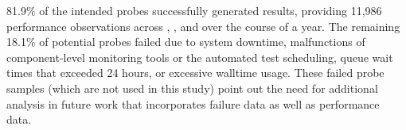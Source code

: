 81.9\% of the intended probes successfully generated results, providing 
11,986 performance observations across \mira, \cori, and \edison over the
course of a year.
The remaining 18.1\% of potential probes failed due to system downtime,
malfunctions of component-level monitoring tools or the automated test
scheduling, queue wait times that exceeded 24 hours, or excessive walltime
usage.  These failed probe samples (which are not used in this study) point out the need
for additional analysis in future work that incorporates failure data as
well as performance data.
